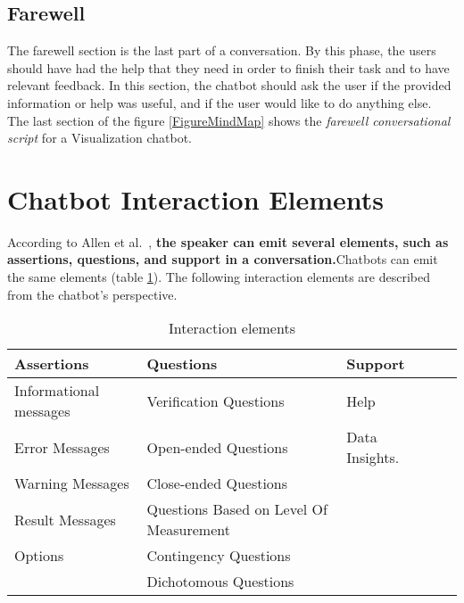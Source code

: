 \documentclass[a4paper,10pt]{article}
\begin{document}
\subsection{Farewell}
The farewell section is the last part of a conversation. By this phase, the users should have had the help that they need in order to finish their task and to have relevant feedback. In this section, the chatbot should ask the user if the provided information or help was useful, and if the user would like to do anything else. The last section of the figure \ref{FigureMindMap} shows the \textit{farewell conversational script} for a Visualization chatbot. 

\section{Chatbot Interaction Elements}
According to Allen et al.~\cite{allen1978conversation}, \textbf{the speaker can emit several elements, such as assertions, questions, and support in a conversation.}Chatbots can emit the same elements (table \ref{InteractionElementsTable}). The following interaction elements are described from the chatbot's perspective. 


\begin{table}[]
\centering
\begin{tabular}{lllll}
\hline
\textbf{Assertions}    & \textbf{Questions}     & \textbf{Support}   \\
\hline
Informational messages & Verification Questions & Help      \\
Error Messages         & Open-ended Questions         & Data Insights.  \\
Warning Messages                       & Close-ended Questions        &       \\
Result Messages                       & Questions Based on Level Of Measurement       &       \\
Options                       & Contingency Questions       &       \\    
                       & Dichotomous Questions       &       \\  
     \hline                   
\end{tabular}
\caption{Interaction elements}
\label{InteractionElementsTable}
\end{table}
\end{document}
